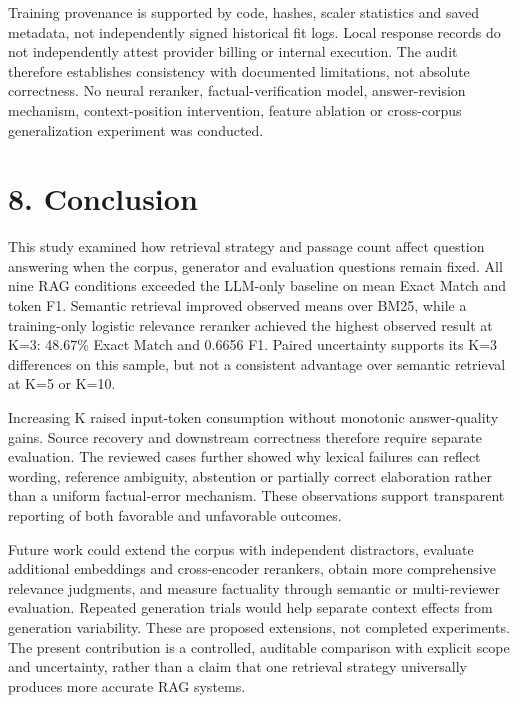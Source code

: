 \documentclass[
  11pt,
]{article}
\begin{document}
Training provenance is supported by code, hashes, scaler statistics and
saved metadata, not independently signed historical fit logs. Local
response records do not independently attest provider billing or
internal execution. The audit therefore establishes consistency with
documented limitations, not absolute correctness. No neural reranker,
factual-verification model, answer-revision mechanism, context-position
intervention, feature ablation or cross-corpus generalization experiment
was conducted.

\hypertarget{conclusion}{%
\section{8. Conclusion}\label{conclusion}}

This study examined how retrieval strategy and passage count affect
question answering when the corpus, generator and evaluation questions
remain fixed. All nine RAG conditions exceeded the LLM-only baseline on
mean Exact Match and token F1. Semantic retrieval improved observed
means over BM25, while a training-only logistic relevance reranker
achieved the highest observed result at K=3: 48.67\% Exact Match and
0.6656 F1. Paired uncertainty supports its K=3 differences on this
sample, but not a consistent advantage over semantic retrieval at K=5 or
K=10.

Increasing K raised input-token consumption without monotonic
answer-quality gains. Source recovery and downstream correctness
therefore require separate evaluation. The reviewed cases further showed
why lexical failures can reflect wording, reference ambiguity,
abstention or partially correct elaboration rather than a uniform
factual-error mechanism. These observations support transparent
reporting of both favorable and unfavorable outcomes.

Future work could extend the corpus with independent distractors,
evaluate additional embeddings and cross-encoder rerankers, obtain more
comprehensive relevance judgments, and measure factuality through
semantic or multi-reviewer evaluation. Repeated generation trials would
help separate context effects from generation variability. These are
proposed extensions, not completed experiments. The present contribution
is a controlled, auditable comparison with explicit scope and
uncertainty, rather than a claim that one retrieval strategy universally
produces more accurate RAG systems.

  
\end{document}
